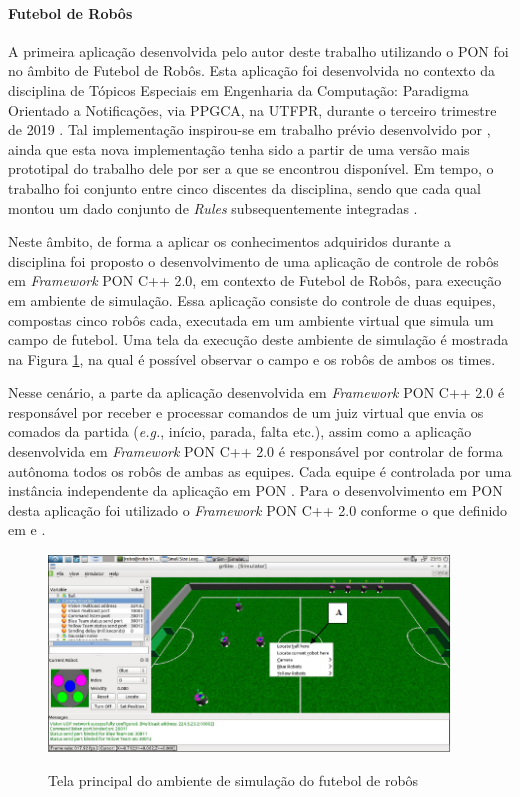 \paragraph{Futebol de Robôs}

A primeira aplicação desenvolvida pelo autor deste trabalho utilizando o PON foi
no âmbito de Futebol de Robôs. Esta aplicação foi desenvolvida no contexto da
disciplina de Tópicos Especiais em Engenharia da Computação: Paradigma Orientado
a Notificações, via PPGCA, na UTFPR, durante o terceiro trimestre de 2019
\cite{lima_2020}. Tal implementação inspirou-se em trabalho prévio desenvolvido
por , ainda que esta nova implementação tenha sido a
partir de uma versão mais prototipal do trabalho dele por ser a que se encontrou
disponível. Em tempo, o trabalho foi conjunto entre cinco discentes da
disciplina, sendo que cada qual montou um dado conjunto de \textit{Rules}
subsequentemente integradas \cite{lima_2020}.

Neste âmbito, de forma a aplicar os conhecimentos adquiridos durante a
disciplina foi proposto o desenvolvimento de uma aplicação de controle de robôs
em \textit{Framework} PON C++ 2.0, em contexto de Futebol de Robôs, para
execução em ambiente de simulação. Essa aplicação consiste do controle de duas
equipes, compostas cinco robôs cada, executada em um ambiente virtual que simula
um campo de futebol. Uma tela da execução deste ambiente de simulação é mostrada
na Figura \ref{fig:futebol_robos}, na qual é possível observar o campo e os
robôs de ambos os times.

Nesse cenário, a parte da aplicação desenvolvida em \textit{Framework} PON C++
2.0 é responsável por receber e processar comandos de um juiz virtual que envia
os comados da partida (\textit{e.g.}, início, parada, falta etc.), assim como a
aplicação desenvolvida em \textit{Framework} PON C++ 2.0 é responsável por
controlar de forma autônoma todos os robôs de ambas as equipes. Cada equipe é
controlada por uma instância independente da aplicação em PON \cite{lima_2020}.
Para o desenvolvimento em PON desta aplicação foi utilizado o \textit{Framework}
PON C++ 2.0 conforme o que definido em  e
. 

\begin{figure}[!htb]
  \centering
  \caption{Tela principal do ambiente de simulação do futebol de robôs}
  \includegraphics[width=0.95\textwidth]{../figures/futebol_robos.png}
  \smallskip
  \label{fig:futebol_robos}
\end{figure}

